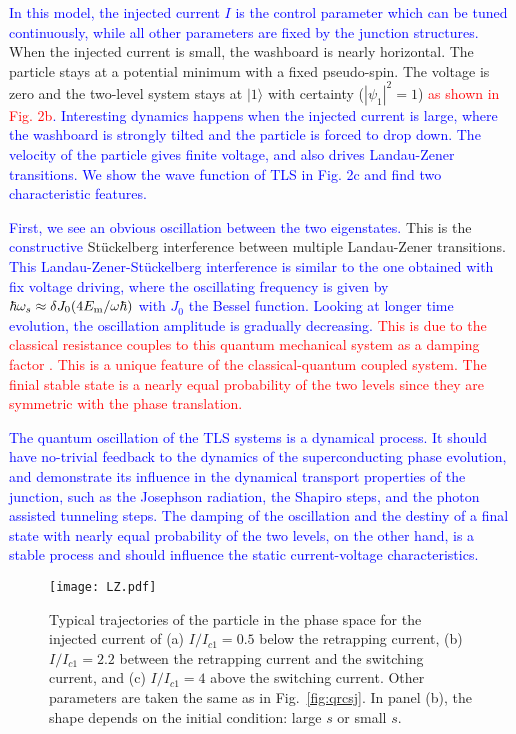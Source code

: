 \documentclass[aps,prl,twocolumn,showpacs,showpacs,10pt,superscriptaddress]{revtex4-1}
\newcommand{\red}[1]{\textcolor{red}{#1}}
\newcommand{\blue}[1]{\textcolor{blue}{#1}}
\begin{document}
\blue{In this model, the injected current $I$ is the control parameter which can be tuned continuously, while all other parameters are fixed by the junction structures. }
When the injected current is small, the washboard is nearly horizontal. The particle stays at a potential minimum with a fixed pseudo-spin. The voltage is zero and the two-level system stays at $|1\rangle$ with certainty ($|\psi_1|^2=1$) \blue{\red{as shown in Fig. 2b}. Interesting dynamics happens when the injected current is large, where the washboard is strongly tilted and the particle is forced to drop down. The velocity of the particle gives finite voltage, and also drives Landau-Zener transitions. We show the wave function of TLS in Fig. 2c and find two characteristic features.}

\blue{First, we see an obvious oscillation between the two eigenstates.} This is the \blue{constructive} St\"{u}ckelberg interference between multiple Landau-Zener transitions\cite{LZ,noripr}. \blue{This Landau-Zener-St\"{u}ckelberg interference is similar to the one obtained with fix voltage driving, where the  oscillating frequency is given by $\hbar \omega_s \approx \delta J_{0}({4 E_{\rm m}}/{ \omega\hbar})$ with $J_0$ the Bessel function\cite{supplement}. Looking at longer time evolution, the oscillation amplitude is gradually decreasing.} \red{This is due to the classical resistance couples to this quantum mechanical system as a damping factor \cite{tinkhambook}. This is a unique feature of the classical-quantum coupled system.
The finial stable state is a nearly equal probability of the two levels since they are symmetric with the phase translation.}

\blue{The quantum oscillation of the TLS systems is a dynamical process. It should have no-trivial feedback to the dynamics of the superconducting phase evolution, and demonstrate its influence in the dynamical transport properties of the junction, such as the Josephson radiation, the Shapiro steps, and the photon assisted tunneling steps. The damping of the oscillation and the destiny of a final state with nearly equal probability of the two levels, on the other hand, is a stable process and should influence the static current-voltage characteristics.
}


\begin{figure}[t]
\begin{center}
\texttt{[image: LZ.pdf]}
\caption{Typical trajectories of the particle in the phase space for the injected current of (a) $I/I_{c1} = 0.5$ below the retrapping current, (b) $I/I_{c1} = 2.2 $ between the retrapping current and the switching current, and (c) $I/I_{c1} = 4$ above the switching current. Other parameters are taken the same as in Fig.~\ref{fig:qrcsj}. In panel (b), the shape depends on the initial condition: large $s$ or small $s$.}
\label{fig:classical}
\end{center}
\end{figure}
\end{document}
